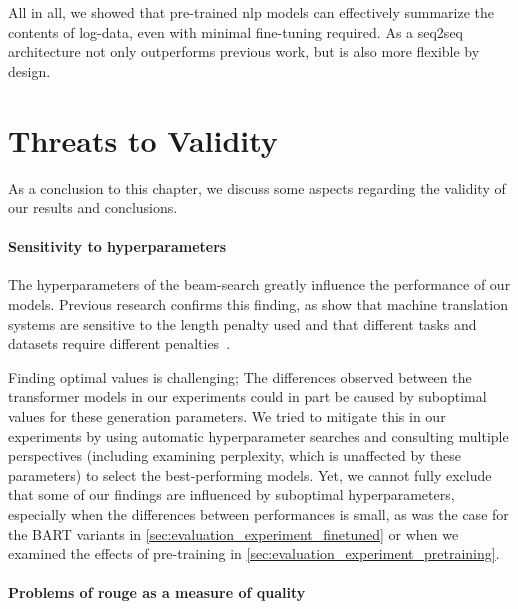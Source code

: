All in all, we showed that pre-trained \ac{nlp} models can effectively summarize the contents of log-data,
even with minimal fine-tuning required.
As a \ac{seq2seq} architecture  not only outperforms previous work, but is also more flexible by design.

\section{Threats to Validity}\label{sec:threats_to_validity}

As a conclusion to this chapter, we discuss some aspects regarding the validity of our results and conclusions.

\paragraph{Sensitivity to hyperparameters}

The hyperparameters of the beam-search greatly influence the performance of our models.
Previous research confirms this finding,
as \citeauthor*{solving_length_problem} show that machine translation systems are sensitive to the length penalty used
and that different tasks and datasets require different penalties~\parencite[9]{solving_length_problem}.

Finding optimal values is challenging;
The differences observed between the transformer models in our experiments
could in part be caused by suboptimal values for these generation parameters.
We tried to mitigate this in our experiments by using automatic hyperparameter searches
and consulting multiple perspectives (including examining perplexity, which is unaffected by these parameters) to select the best-performing models.
Yet, we cannot fully exclude that some of our findings are influenced by suboptimal hyperparameters,
especially when the differences between performances is small, as was the case for the BART variants in \autoref{sec:evaluation_experiment_finetuned}
or when we examined the effects of pre-training in \autoref{sec:evaluation_experiment_pretraining}.

\paragraph{Problems of \acs*{rouge} as a measure of quality}

